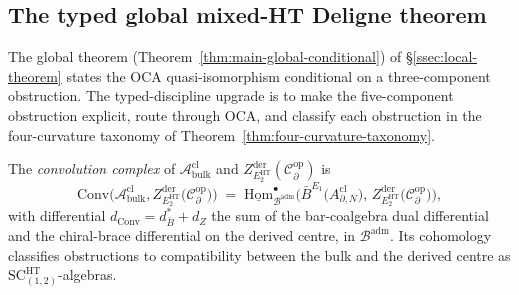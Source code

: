 \subsection{The typed global mixed-HT Deligne theorem}
\label{ssec:typed-global-mixed-ht-deligne}

The global theorem
(Theorem~\ref{thm:main-global-conditional}) of
\S\ref{ssec:local-theorem} states the OCA quasi-isomorphism
conditional on a three-component obstruction.  The typed-discipline
upgrade is to make the five-component obstruction explicit, route
through OCA, and classify each obstruction in the four-curvature
taxonomy of Theorem~\ref{thm:four-curvature-taxonomy}.

\begin{defn}\label{defn:convolution-complex}
The \emph{convolution complex} of \(\mathcal A^{\mathrm{cl}}_{\mathrm{bulk}}\)
and \(Z^{\mathrm{der}}_{E_2^{\mathrm{HT}}}(\mathcal C^{\mathrm{op}}_\partial)\)
is
\begin{equation}\label{eq:convolution-complex-def}
  \mathrm{Conv}\!\bigl(
    \mathcal A^{\mathrm{cl}}_{\mathrm{bulk}},
    Z^{\mathrm{der}}_{E_2^{\mathrm{HT}}}\!\bigl(
      \mathcal C^{\mathrm{op}}_\partial\bigr)\bigr)
   \;=\;
   \underline{\mathrm{Hom}}_{\mathcal B^{\mathrm{adm}}}^\bullet\!\bigl(
     \bar B^{E_1}\!\bigl(A^{\mathrm{cl}}_{\partial,N}\bigr),\,
     Z^{\mathrm{der}}_{E_2^{\mathrm{HT}}}\!\bigl(
       \mathcal C^{\mathrm{op}}_\partial\bigr)\bigr),
\end{equation}
with differential \(d_{\mathrm{Conv}}=d_{\bar B}^*+d_{Z}\) the sum of
the bar-coalgebra dual differential and the chiral-brace differential
on the derived centre, in \(\mathcal B^{\mathrm{adm}}\).  Its cohomology
classifies obstructions to compatibility between the bulk and the
derived centre as \(\mathrm{SC}^{\mathrm{HT}}_{(1,2)}\)-algebras.
\end{defn}


